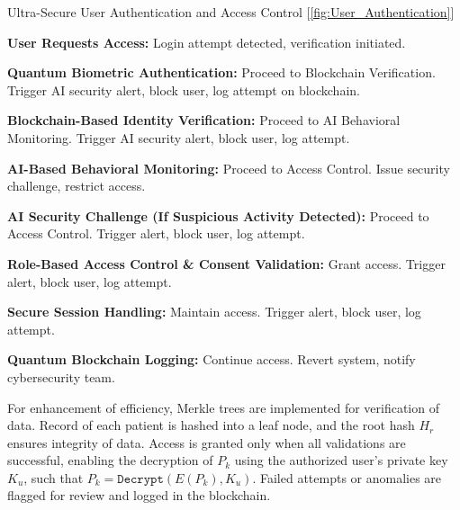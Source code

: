 \documentclass[pdflatex,sn-mathphys-num]{sn-jnl}%
\theoremstyle{thmstyleone}%
\theoremstyle{thmstyletwo}%
\theoremstyle{thmstylethree}%
\begin{document}
\begin{algorithm}[h!]
\caption{Ultra-Secure User Authentication and Access Control [\ref{fig:User_Authentication}]}
\begin{algorithmic}[1]
\STATE 	\textbf{User Requests Access:} Login attempt detected, verification initiated.

\STATE 	\textbf{Quantum Biometric Authentication:} 
 Proceed to Blockchain Verification.
\ELSE Trigger AI security alert, block user, log attempt on blockchain. \ENDIF

\STATE 	\textbf{Blockchain-Based Identity Verification:} 
 Proceed to AI Behavioral Monitoring.
\ELSE Trigger AI security alert, block user, log attempt. \ENDIF

\STATE 	\textbf{AI-Based Behavioral Monitoring:} 
 Proceed to Access Control.
\ELSE Issue security challenge, restrict access. \ENDIF

\STATE 	\textbf{AI Security Challenge (If Suspicious Activity Detected):} 
 Proceed to Access Control.
\ELSE Trigger alert, block user, log attempt. \ENDIF

\STATE 	\textbf{Role-Based Access Control \& Consent Validation:} 
 Grant access.
\ELSE Trigger alert, block user, log attempt. \ENDIF

\STATE 	\textbf{Secure Session Handling:} 
 Maintain access.
\ELSE Trigger alert, block user, log attempt. \ENDIF

\STATE 	\textbf{Quantum Blockchain Logging:} 
 Continue access.
\ELSE Revert system, notify cybersecurity team. \ENDIF
\end{algorithmic}
\end{algorithm}



For enhancement of efficiency, Merkle trees are implemented for verification of data. Record of each patient is hashed into a leaf node, and the root hash \( H_r \) ensures integrity of data. Access is granted only when all validations are successful, enabling the decryption of \( P_k \) using the authorized user’s private key \( K_u \), such that \( P_k = \texttt{Decrypt}(E(P_k), K_u) \). Failed attempts or anomalies are flagged for review and logged in the blockchain\cite{bib8}.




\end{document}
